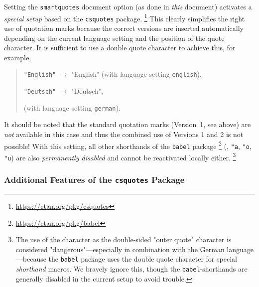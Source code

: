Setting the \texttt{smartquotes} document option (as done in \emph{this} document)
activates a \emph{special setup} based on the \texttt{csquotes} package.%
\footnote{\url{https://ctan.org/pkg/csquotes}}
This clearly simplifies the right use of quotation marks because the
correct versions are inserted automatically depending on the current language
setting and the position of the quote character. It is sufficient to use a double
quote character \texttt{\textquotedbl} to achieve this, for example,
%
\begin{quote}
	\verb!"English"! $\rightarrow$ "English" (with language setting
	\texttt{english}),\\
	\begin{german}%
		\verb!"Deutsch"! $\rightarrow$ "Deutsch",
	\end{german}
	(with language setting \texttt{german}).
\end{quote}
%
It should be noted that the standard quotation marks (Version~1, see
above) are \emph{not} available in this case and thus the combined use of
Versions 1 and 2 is not possible! With this setting, all other shorthands of
the \texttt{babel} package%
\footnote{\url{https://ctan.org/pkg/babel}}
(\eg, \verb!"a!, \verb!"o!, \verb!"u!) are also \emph{permanently disabled}
and cannot be reactivated locally either.%
\footnote{The use of the \texttt{\textquotedbl} character as the double-sided
"outer quote" character is considered "dangerous"---especially in combination
with the German language---because the \texttt{babel} package uses the double
quote character for special \emph{shorthand} macros. We bravely ignore this,
though the \texttt{babel}-shorthands are generally disabled in the current
setup to avoid trouble.}

\subsubsection{Additional Features of the \texttt{csquotes} Package}

